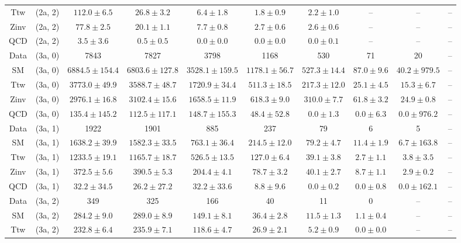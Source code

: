 \begin{table}[h!]
{\begin{tabular}{cccccccccc}
	Ttw & (2a, 2) & $112.0\pm 6.5$ & $26.8\pm 3.2$ & $6.4\pm 1.8$ & $1.8\pm 0.9$ & $2.2\pm 1.0$ & -- & -- & -- \\[0.5ex] 
	Zinv & (2a, 2) & $77.8\pm 2.5$ & $20.1\pm 1.1$ & $7.7\pm 0.8$ & $2.7\pm 0.6$ & $2.6\pm 0.6$ & -- & -- & -- \\[0.5ex] 
	QCD & (2a, 2) & $3.5\pm 3.6$ & $0.5\pm 0.5$ & $0.0\pm 0.0$ & $0.0\pm 0.0$ & $0.0\pm 0.1$ & -- & -- & -- \\[0.5ex] 
	Data & (3a, 0) & 7843 & 7827 & 3798 & 1168 & 530 & 71 & 20 & -- \\[0.5ex] 
	SM & (3a, 0) & $6884.5\pm 154.4$ & $6803.6\pm 127.8$ & $3528.1\pm 159.5$ & $1178.1\pm 56.7$ & $527.3\pm 14.4$ & $87.0\pm 9.6$ & $40.2\pm 979.5$ & -- \\[0.5ex] 
	Ttw & (3a, 0) & $3773.0\pm 49.9$ & $3588.7\pm 48.7$ & $1720.9\pm 34.4$ & $511.3\pm 18.5$ & $217.3\pm 12.0$ & $25.1\pm 4.5$ & $15.3\pm 6.7$ & -- \\[0.5ex] 
	Zinv & (3a, 0) & $2976.1\pm 16.8$ & $3102.4\pm 15.6$ & $1658.5\pm 11.9$ & $618.3\pm 9.0$ & $310.0\pm 7.7$ & $61.8\pm 3.2$ & $24.9\pm 0.8$ & -- \\[0.5ex] 
	QCD & (3a, 0) & $135.4\pm 145.2$ & $112.5\pm 117.1$ & $148.7\pm 155.3$ & $48.4\pm 52.8$ & $0.0\pm 1.3$ & $0.0\pm 6.3$ & $0.0\pm 976.2$ & -- \\[0.5ex] 
	Data & (3a, 1) & 1922 & 1901 & 885 & 237 & 79 & 6 & 5 & -- \\[0.5ex] 
	SM & (3a, 1) & $1638.2\pm 39.9$ & $1582.3\pm 33.5$ & $763.1\pm 36.4$ & $214.5\pm 12.0$ & $79.2\pm 4.7$ & $11.4\pm 1.9$ & $6.7\pm 163.8$ & -- \\[0.5ex] 
	Ttw & (3a, 1) & $1233.5\pm 19.1$ & $1165.7\pm 18.7$ & $526.5\pm 13.5$ & $127.0\pm 6.4$ & $39.1\pm 3.8$ & $2.7\pm 1.1$ & $3.8\pm 3.5$ & -- \\[0.5ex] 
	Zinv & (3a, 1) & $372.5\pm 5.6$ & $390.5\pm 5.3$ & $204.4\pm 4.1$ & $78.7\pm 3.2$ & $40.1\pm 2.7$ & $8.7\pm 1.1$ & $2.9\pm 0.2$ & -- \\[0.5ex] 
	QCD & (3a, 1) & $32.2\pm 34.5$ & $26.2\pm 27.2$ & $32.2\pm 33.6$ & $8.8\pm 9.6$ & $0.0\pm 0.2$ & $0.0\pm 0.8$ & $0.0\pm 162.1$ & -- \\[0.5ex] 
	Data & (3a, 2) & 349 & 325 & 166 & 40 & 11 & 0 & -- & -- \\[0.5ex] 
	SM & (3a, 2) & $284.2\pm 9.0$ & $289.0\pm 8.9$ & $149.1\pm 8.1$ & $36.4\pm 2.8$ & $11.5\pm 1.3$ & $1.1\pm 0.4$ & -- & -- \\[0.5ex] 
	Ttw & (3a, 2) & $232.8\pm 6.4$ & $235.9\pm 7.1$ & $118.6\pm 4.7$ & $26.9\pm 2.1$ & $5.2\pm 0.9$ & $0.0\pm 0.0$ & -- & -- \\[0.5ex] 

\end{tabular}}
\end{table}
